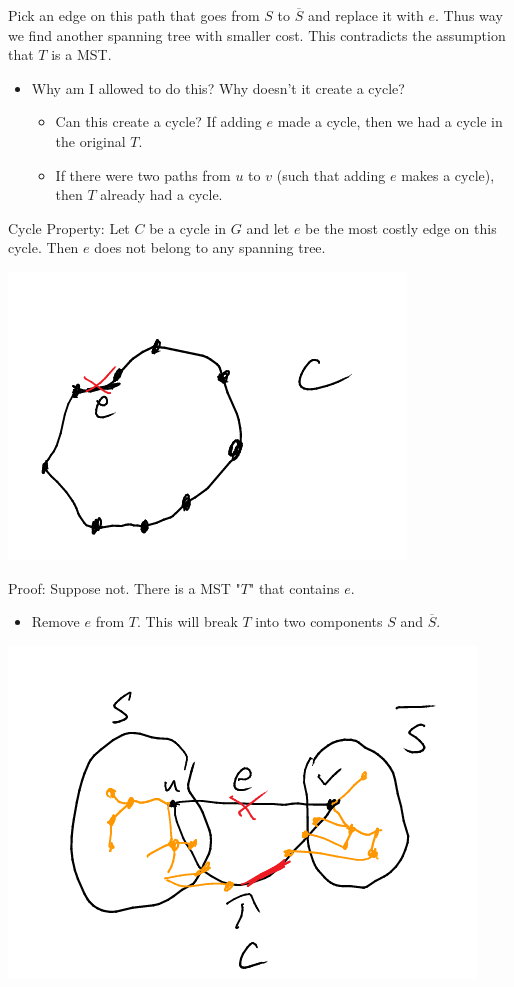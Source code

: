 \documentclass[11pt]{article}
\begin{document}
Pick an edge on this path that goes from \(S\) to \(\overline{S}\) and replace it with \(e\). Thus way we find another spanning tree with smaller cost. This contradicts the assumption that \(T\) is a MST.
\begin{itemize}
\item Why am I allowed to do this? Why doesn't it create a cycle?
\begin{itemize}
\item Can this create a cycle? If adding \(e\) made a cycle, then we had a cycle in the original \(T\).
\item If there were two paths from \(u\) to \(v\) (such that adding \(e\) makes a cycle), then \(T\) already had a cycle.
\end{itemize}
\end{itemize}
Cycle Property: Let \(C\) be a cycle in \(G\) and let \(e\) be the most costly edge on this cycle. Then \(e\) does not belong to any spanning tree.
\begin{center}
\includegraphics[width=.9\linewidth]{./Images/i49.png}
\end{center}
Proof: Suppose not. There is a MST "\(T\)" that contains \(e\).
\begin{itemize}
\item Remove \(e\) from \(T\). This will break \(T\) into two components \(S\) and \(\overline{S}\).
\end{itemize}
\begin{center}
\includegraphics[width=.9\linewidth]{./Images/i50.png}
\end{center}
\end{document}
